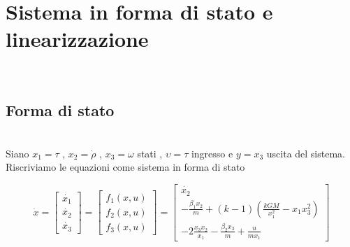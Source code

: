 \documentclass{article}
\begin{document}
\section{Sistema in forma di stato e linearizzazione}\\
\subsection{Forma di stato}\\
Siano $x_1=\tau$ , $x_2=\Dot{\rho}$ , $x_3=\omega$ stati , $\upsilon=\tau$ ingresso e $y=x_3$ uscita del sistema.\\
Riscriviamo le equazioni come sistema in forma di stato\\
\begin{large}
\begin{equation}
\Dot{x}=
\begin{bmatrix} \Dot{x_1} \\\Dot{x_2} \\ \Dot{x_3}\end{bmatrix} =
\begin{bmatrix} f_1(x,u) \\ f_2(x,u) \\ f_3(x,u)\end{bmatrix} =
\begin{bmatrix} \dot{x_2} \\
-\frac{\beta_1 x_2}{m} + (k-1)(\frac{kG M}{x_1^2} - x_1 x_3^2) \\ 
-2\frac{x_3 x_2}{x_1} - \frac{\beta_2 x_3}{m} + \frac{u}{m x_1}  \end{bmatrix}
\end{equation}
\end{large}
\end{document}
